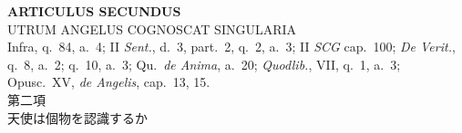 \documentclass[paper=a4paper,fontsize=10pt,jafontsize=9pt,titlepage]{jlreq}
\begin{document}
\newpage
{}
{}
\setcounter{section}{2}
\setcounter{subsection}{0}






\begin{center}
{\Large {\bfseries ARTICULUS SECUNDUS}}\\ {\large UTRUM ANGELUS COGNOSCAT
SINGULARIA}\\ {\footnotesize Infra, q.~84, a.~4; II {\itshape Sent.},
d.~3, part.~2, q.~2, a.~3; II {\itshape SCG} cap.~100; {\itshape De
Verit.}, q.~8, a.~2; q.~10, a.~3; Qu.~{\itshape de Anima}, a.~20;
{\itshape Quodlib.}, VII, q.~1, a.~3; Opusc.~XV, {\itshape de
Angelis}, cap.~13, 15.}\\ {\Large 第二項\\天使は個物を認識するか}
\end{center}
\end{document}
